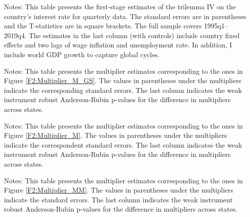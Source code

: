 \documentclass[12pt]{article}
\newcommand{\annote}[1]{\parbox{\textwidth}{\renewcommand{\baselinestretch}{1.0}\vspace{12pt} \footnotesize Notes: #1}}
\begin{document}
\begin{appendices}
\begin{table}[ht]
\centering
\caption{First-Stage of trilemma IV - Quarterly Data} \label{T:First_Stage_Quarter}
\vspace{1ex}
\def\sym#1{\ifmmode^{#1}\else\(^{#1}\)\fi}

\annote{This table presents the first-stage estimates of the trilemma IV on the country's interest rate for quarterly data. The standard errors are in parentheses and the T-statistics are in square brackets. The full sample covers 1995q1–2019q4. The estimates in the last column (with controls) include country fixed effects and two lags of wage inflation and unemployment rate. In addition, I include world GDP growth to capture global cycles.}
\end{table}

\begin{singlespace}
\begin{table}[ht]
\footnotesize
\centering
\def\sym#1{\ifmmode^{#1}\else\(^{#1}\)\fi}
\caption{Estimates of multipliers across sub-samples \label{T:SDPM_GS}}

\annote{\footnotesize This table presents the multiplier estimates corresponding to the ones in Figure \ref{F2:Multiplier_M_GS}. The values in parentheses under the multipliers indicate the corresponding standard errors. The last column indicates the weak instrument robust Anderson-Rubin p-values for the difference in multipliers across states.}
\end{table}



\begin{table}[ht]
\footnotesize
\centering
\def\sym#1{\ifmmode^{#1}\else\(^{#1}\)\fi}
\caption{Estimates of multipliers across states of inflation \label{T:SDPM}}

\annote{\footnotesize This table presents the multiplier estimates corresponding to the ones in Figure \ref{F2:Multiplier_M}. The values in parentheses under the multipliers indicate the correspondent standard errors. The last column indicates the weak instrument robust Anderson-Rubin p-values for the difference in multipliers across states.}
\end{table}



\begin{table}[ht]
\footnotesize
\centering
\def\sym#1{\ifmmode^{#1}\else\(^{#1}\)\fi}
\caption{Estimates of multipliers across states of inflation \label{T:SDPM_App}}

\annote{\footnotesize This table presents the multiplier estimates corresponding to the ones in Figure \ref{F2:Multiplier_MM}. The values in parentheses under the multipliers indicate the standard errors. The last column indicates the weak instrument robust Anderson-Rubin p-values for the difference in multipliers across states.}
\end{table}
\end{singlespace}


\end{appendices}
\end{document}
